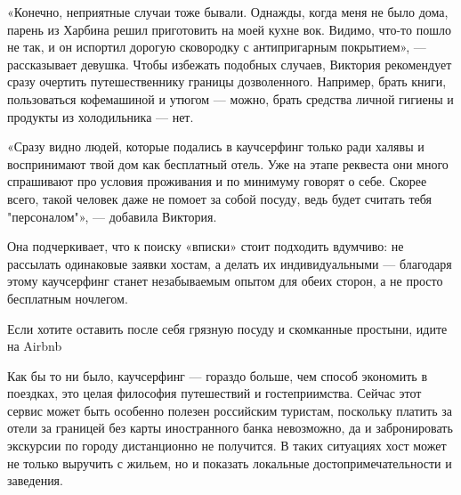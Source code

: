 «Конечно, неприятные случаи тоже бывали. Однажды, когда меня не было дома, парень из Харбина решил приготовить на моей кухне вок. Видимо, что-то пошло не так, и он испортил дорогую сковородку с антипригарным покрытием», — рассказывает девушка. Чтобы избежать подобных случаев, Виктория рекомендует сразу очертить путешественнику границы дозволенного. Например, брать книги, пользоваться кофемашиной и утюгом — можно, брать средства личной гигиены и продукты из холодильника — нет.

«Сразу видно людей, которые подались в каучсерфинг только ради халявы и воспринимают твой дом как бесплатный отель. Уже на этапе реквеста они много спрашивают про условия проживания и по минимуму говорят о себе. Скорее всего, такой человек даже не помоет за собой посуду, ведь будет считать тебя "персоналом"», — добавила Виктория.

Она подчеркивает, что к поиску «вписки» стоит подходить вдумчиво: не рассылать одинаковые заявки хостам, а делать их индивидуальными — благодаря этому каучсерфинг станет незабываемым опытом для обеих сторон, а не просто бесплатным ночлегом.

\begin{center}
    \Large
    Если хотите оставить после себя грязную посуду и скомканные простыни, идите на Airbnb
\end{center}

Как бы то ни было, каучсерфинг — гораздо больше, чем способ экономить в поездках, это целая философия путешествий и гостеприимства. Сейчас этот сервис может быть особенно полезен российским туристам, поскольку платить за отели за границей без карты иностранного банка невозможно, да и забронировать экскурсии по городу дистанционно не получится. В таких ситуациях хост может не только выручить с жильем, но и показать локальные достопримечательности и заведения.